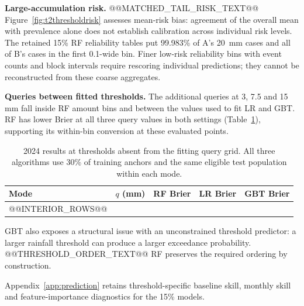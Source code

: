 \textbf{Large-accumulation risk.} @@MATCHED_TAIL_RISK_TEXT@@ Figure~\ref{fig:t2thresholdrisk} assesses mean-risk bias: agreement of the overall mean with prevalence alone does not establish calibration across individual risk levels. The retained 15\% RF reliability tables put 99.983\% of A's 20~mm cases and all of B's cases in the first 0.1-wide bin. Finer low-risk reliability bins with event counts and block intervals require rescoring individual predictions; they cannot be reconstructed from these coarse aggregates.

\textbf{Queries between fitted thresholds.} The additional queries at 3, 7.5 and 15 mm fall inside RF amount bins and between the values used to fit LR and GBT. RF has lower Brier at all three query values in both settings (Table~\ref{tab:interior}), supporting its within-bin conversion at these evaluated points.
\begin{table}[!ht]\centering\small
\begin{tabular}{lrrrr}\toprule
Mode & $q$ (mm) & RF Brier & LR Brier & GBT Brier\\\midrule
@@INTERIOR_ROWS@@
\bottomrule\end{tabular}
\caption{2024 results at thresholds absent from the fitting query grid. All three algorithms use 30\% of training anchors and the same eligible test population within each mode.}\label{tab:interior}
\end{table}
\FloatBarrier
GBT also exposes a structural issue with an unconstrained threshold predictor: a larger rainfall threshold can produce a larger exceedance probability. @@THRESHOLD_ORDER_TEXT@@ RF preserves the required ordering by construction.

Appendix~\ref{app:prediction} retains threshold-specific baseline skill, monthly skill and feature-importance diagnostics for the 15\% models.

\FloatBarrier
